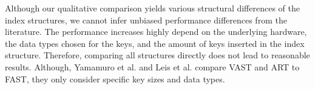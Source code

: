 \documentclass[conference]{IEEEtran}
\begin{document}
Although our qualitative comparison yields various structural differences of the index structures, we cannot infer unbiased performance differences from the literature. The performance increases highly depend on the underlying hardware, the data types chosen for the keys, and the amount of keys inserted in the index structure. Therefore, comparing all structures directly does not lead to reasonable results. Although, Yamamuro et al. and Leis et al. compare VAST \cite{b5} and ART \cite{b4} to FAST, they only consider specific key sizes and data types. 




\end{document}
